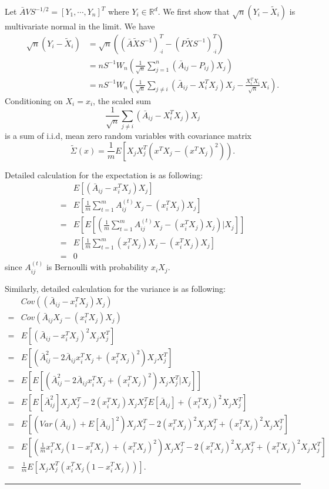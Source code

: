 \documentclass[a4paper]{article}
\newenvironment{proof}{{\bf Proof:  }}{\hfill\rule{2mm}{2mm}}
\begin{document}
\begin{proof}
Let $\bar{A} V S^{-1/2} = [Y_1, \cdots, Y_n]^T$ where $Y_i \in \mathbb{R}^d$. We first show that $\sqrt{n} (Y_i - \tilde{X}_i)$ is multivariate normal in the limit. We have
\begin{align*}
	\sqrt{n}(Y_i - \tilde{X}_i) & = \sqrt{n} \left( (\bar{A} \tilde{X} S^{-1})^T_{\cdot i}  - (P \tilde{X} S^{-1})^T_{\cdot i}\right) \\
    & = n S^{-1} W_n \left( \frac{1}{\sqrt{n}} \sum_{j=1}^n (\bar{A}_{ij} - P_{ij}) X_j \right) \\
    & = n S^{-1} W_n \left( \frac{1}{\sqrt{n}} \sum_{j \ne i}(\bar{A}_{ij} - X_i^T X_j)X_j - \frac{X_i^T X_i}{\sqrt{n}} X_i \right).
\end{align*}
Conditioning on $X_i = x_i$, the scaled sum
\[
	\frac{1}{\sqrt{n}} \sum_{j \ne i}(\bar{A}_{ij} - X_i^T X_j)X_j
\]
is a sum of i.i.d, mean zero random variables with covariance matrix
\[
	\tilde{\Sigma}(x) = \frac{1}{m} E \left[ X_j X_j^T (x^T X_j - (x^T X_j)^2 ) \right).
\]

Detailed calculation for the expectation is as following:
\begin{align*}
	& E \left[ (\bar{A}_{ij} - x_i^T X_j) X_j \right] \\
    = & E\left[ \frac{1}{m} \sum_{t = 1}^m A^{(t)}_{ij} X_j - (x_i^T X_j) X_j \right] \\
    = & E\left[ E\left[ \left( \frac{1}{m} \sum_{t = 1}^m A^{(t)}_{ij} X_j - (x_i^T X_j) X_j \right) | X_j \right] \right] \\
    = & E\left[  \frac{1}{m} \sum_{t = 1}^m (x_i^T X_j) X_j - (x_i^T X_j) X_j \right] \\
    = & 0
\end{align*}
since $A_{ij}^{(t)}$ is Bernoulli with probability $x_i X_j$.

Similarly, detailed calculation for the variance is as following:
\begin{align*}
	& Cov \left( (\bar{A}_{ij} - x_i^T X_j) X_j \right) \\
    = & Cov \left(\bar{A}_{ij} X_j - (x_i^T X_j) X_j \right) \\
    = & E \left[ (\bar{A}_{ij} - x_i^T X_j)^2 X_j X_j^T \right] \\
    = & E \left[ (\bar{A}_{ij}^2 - 2 \bar{A}_{ij} x_i^T X_j + (x_i^T X_j)^2) X_j X_j^T \right] \\
    = & E \left[ E \left[ (\bar{A}_{ij}^2 - 2 \bar{A}_{ij} x_i^T X_j + (x_i^T X_j)^2) X_j X_j^T | X_j \right] \right] \\
    = & E \left[ E[\bar{A}_{ij}^2] X_j X_j^T - 2(x_i^T X_j) X_j X_j^T E[\bar{A}_{ij}] + (x_i^T X_j)^2 X_j X_j^T \right] \\
    = & E \left[ (Var(\bar{A}_{ij}) + E[\bar{A}_{ij}]^2) X_j X_j^T - 2(x_i^T X_j)^2 X_j X_j^T + (x_i^T X_j)^2 X_j X_j^T \right] \\
    = & E \left[ (\frac{1}{m} x_i^T X_j (1 - x_i^T X_j) + (x_i^T X_j)^2) X_j X_j^T - 2(x_i^T X_j)^2 X_j X_j^T + (x_i^T X_j)^2 X_j X_j^T \right] \\
    = & \frac{1}{m} E \left[ X_j X_j^T (x_i^T X_j (1 - x_i^T X_j)) \right].
\end{align*}



\end{proof}
\end{document}
